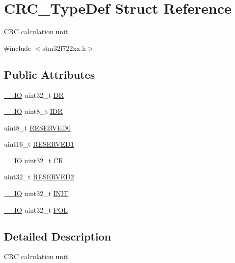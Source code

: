 \hypertarget{struct_c_r_c___type_def}{}\section{C\+R\+C\+\_\+\+Type\+Def Struct Reference}
\label{struct_c_r_c___type_def}


C\+RC calculation unit.  




{\ttfamily \#include $<$stm32f722xx.\+h$>$}

\subsection*{Public Attributes}
\begin{DoxyCompactItemize}
\item 
\mbox{\hyperlink{core__sc300_8h_aec43007d9998a0a0e01faede4133d6be}{\+\_\+\+\_\+\+IO}} uint32\+\_\+t \mbox{\hyperlink{struct_c_r_c___type_def_a50cb22870dbb9001241cec694994e5ef}{DR}}
\item 
\mbox{\hyperlink{core__sc300_8h_aec43007d9998a0a0e01faede4133d6be}{\+\_\+\+\_\+\+IO}} uint8\+\_\+t \mbox{\hyperlink{struct_c_r_c___type_def_ad84e8694cd4b5375ee533c2d875c3b5a}{I\+DR}}
\item 
uint8\+\_\+t \mbox{\hyperlink{struct_c_r_c___type_def_a70dfd1730dba65041550ef55a44db87c}{R\+E\+S\+E\+R\+V\+E\+D0}}
\item 
uint16\+\_\+t \mbox{\hyperlink{struct_c_r_c___type_def_a8b205c6e25b1808ac016db2356b3021d}{R\+E\+S\+E\+R\+V\+E\+D1}}
\item 
\mbox{\hyperlink{core__sc300_8h_aec43007d9998a0a0e01faede4133d6be}{\+\_\+\+\_\+\+IO}} uint32\+\_\+t \mbox{\hyperlink{struct_c_r_c___type_def_af33fa5c173e1c102e6d0242fe60e569f}{CR}}
\item 
uint32\+\_\+t \mbox{\hyperlink{struct_c_r_c___type_def_a4dd260a7d589d62975619a42f9a6abe4}{R\+E\+S\+E\+R\+V\+E\+D2}}
\item 
\mbox{\hyperlink{core__sc300_8h_aec43007d9998a0a0e01faede4133d6be}{\+\_\+\+\_\+\+IO}} uint32\+\_\+t \mbox{\hyperlink{struct_c_r_c___type_def_a13639f272f5093e184d726ed5a8945a3}{I\+N\+IT}}
\item 
\mbox{\hyperlink{core__sc300_8h_aec43007d9998a0a0e01faede4133d6be}{\+\_\+\+\_\+\+IO}} uint32\+\_\+t \mbox{\hyperlink{struct_c_r_c___type_def_a0a6a8675609cee77ff162e575cfc74e8}{P\+OL}}
\end{DoxyCompactItemize}


\subsection{Detailed Description}
C\+RC calculation unit. 

